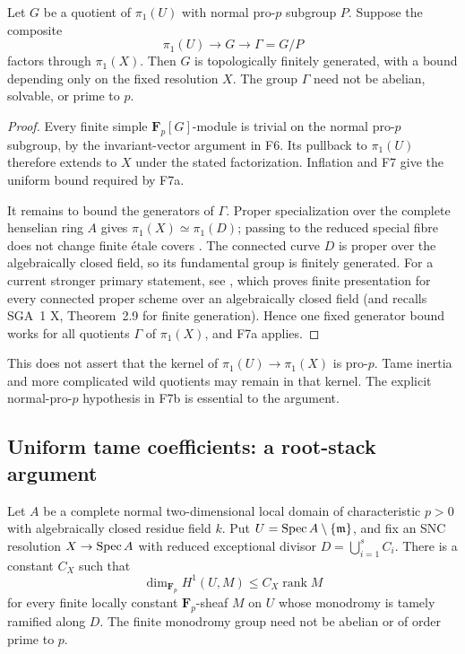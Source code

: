 \begin{corollary}
Let $G$ be a quotient of $\pi_1(U)$ with normal pro-$p$ subgroup
$P$. Suppose the composite
\[
 \pi_1(U)\longrightarrow G\longrightarrow\Gamma=G/P
\]
factors through $\pi_1(X)$. Then $G$ is topologically finitely
generated, with a bound depending only on the fixed resolution $X$.
The group $\Gamma$ need not be abelian, solvable, or prime to $p$.
\end{corollary}
\begin{proof}
Every finite simple $\mathbf F_p[G]$-module is trivial on the normal
pro-$p$ subgroup, by the invariant-vector argument in F6. Its
pullback to $\pi_1(U)$ therefore extends to $X$ under the stated
factorization. Inflation and F7 give the uniform bound required
by F7a.

It remains to bound the generators of $\Gamma$. Proper
specialization over the complete henselian ring $A$ gives
$\pi_1(X)\simeq\pi_1(D)$; passing to the reduced special fibre does
not change finite \'etale covers
\cite[Lemma 58.9.1, tag 0A48]{StacksProperEtaleSpecialization}.
The connected curve $D$ is proper over the algebraically closed
field, so its fundamental group is finitely generated. For a
current stronger primary statement, see
\cite[Theorem 1.2, p.~1]{LaraSrinivasStix2024}, which proves finite
presentation for every connected proper scheme over an
algebraically closed field (and recalls SGA~1 X, Theorem~2.9 for
finite generation). Hence one fixed generator bound works for
all quotients $\Gamma$ of $\pi_1(X)$, and F7a applies.
\end{proof}

This does not assert that the kernel of $\pi_1(U)\to\pi_1(X)$ is
pro-$p$. Tame inertia and more complicated wild quotients may
remain in that kernel. The explicit normal-pro-$p$ hypothesis in
F7b is essential to the argument.

\subsection{Uniform tame coefficients: a root-stack argument}

\begin{proposition}
Let $A$ be a complete normal two-dimensional local domain of
characteristic $p>0$ with algebraically closed residue field $k$.
Put $U=\operatorname{Spec} A\setminus\{\mathfrak m\}$, and fix an SNC resolution
$X\to\operatorname{Spec} A$ with reduced exceptional divisor
$D=\bigcup_{i=1}^s C_i$. There is a constant $C_X$ such that
\[
 \dim_{\mathbf F_p}H^1(U,M)\leq C_X\operatorname{rank}M
 \tag{F8.0}
\]
for every finite locally constant $\mathbf F_p$-sheaf $M$ on $U$
whose monodromy is tamely ramified along $D$.
The finite monodromy group need not be abelian or of order prime to $p$.
\end{proposition}

